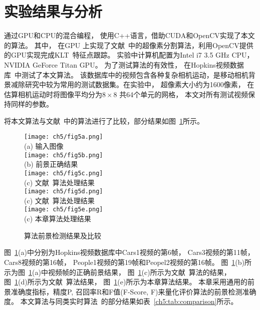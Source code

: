 \section{实验结果与分析}
\label{ch5:sec:results}
 通过GPU和CPU的混合编程， 使用C++语言，借助CUDA和OpenCV实现了本文的算法。 其中， 在GPU 上实现了文献~\cite{superpixel}中的超像素分割算法，利用OpenCV提供的GPU实现完成KLT~\cite{KLT}特征点跟踪。 实验中计算机配置为Intel i7 3.5 GHz CPU， NVIDIA GeForce Titan GPU。 为了测试算法的有效性， 在Hopkins视频数据库~\cite{HopKinsDataSet}中测试了本文算法。 该数据库中的视频包含各种复杂相机运动，是移动相机背景减除研究中较为常用的测试数据集。在实验中， 超像素大小约为1600像素， 在估算相机运动时将图像平均分为$8 \times 8$ 共64个单元的网格， 本文对所有测试视频保持同样的参数。\par
将本文算法与文献~中的算法进行了比较，部分结果如图~\ref{ch5:fig:comparison}所示。
\begin{figure}[ht]
  \centering
  \texttt{[image: ch5/fig5a.png]}\\
  (a) 输入图像\\
   \texttt{[image: ch5/fig5b.png]}\\
   (b) 前景正确结果\\
   \texttt{[image: ch5/fig5c.png]}\\
   (c) 文献~算法处理结果\\
   \texttt{[image: ch5/fig5d.png]}\\
   (c) 文献~算法处理结果\\
   \texttt{[image: ch5/fig5e.png]}\\
   (c) 本章算法处理结果\\
  \caption{算法前景检测结果及比较}\label{ch5:fig:comparison}
\end{figure}


图~\ref{ch5:fig:comparison}(a)中分别为Hopkins视频数据库中Cars1视频的第6帧， Cars3视频的第11帧，Cars8视频的第16帧， People1视频的第19帧和Peopel2视频的第16帧。 图~\ref{ch5:fig:comparison}(b)所示为图~\ref{ch5:fig:comparison}(a)中视频帧的正确前景结果， 图~\ref{ch5:fig:comparison}(c)所示为文献~算法的结果， 图~\ref{ch5:fig:comparison}(d)所示为文献~算法结果，  图~\ref{ch5:fig:comparison}(e)所示为本章算法结果。 本章采用通用的前景准确度指标，精度P, 召回率R和F值(F-Score, F)来量化评价算法的前景检测准确度。 本文算法与同类实时算法~\cite{5.8s}的部分结果如表~\ref{ch5:tab:comparison}所示。

